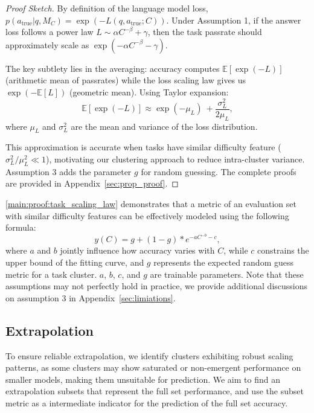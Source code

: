 \begin{proof}[Proof Sketch]
By definition of the language model loss, $p(a_{\text{true}}|q, M_C) = \exp(-L(q, a_{\text{true}}; C))$. Under Assumption 1, if the answer loss follows a power law $L \sim \alpha C^{-\beta} + \gamma$, then the task passrate should approximately scale as $\exp(-\alpha C^{-\beta} - \gamma)$.

The key subtlety lies in the averaging: accuracy computes $\mathbb{E}[\exp(-L)]$ (arithmetic mean of passrates) while the loss scaling law gives us $\exp(-\mathbb{E}[L])$ (geometric mean). Using Taylor expansion:
$$\mathbb{E}[\exp(-L)] \approx \exp(-\mu_L) \ + \frac{\sigma_L^2}{2\mu_L},$$
where $\mu_L$ and $\sigma_L^2$ are the mean and variance of the loss distribution.

This approximation is accurate when tasks have similar difficulty feature ($\sigma_L^2/\mu_L^2 \ll 1$), motivating our clustering approach to reduce intra-cluster variance. Assumption 3 adds the parameter $g$ for random guessing. The complete proofs are provided in Appendix~\ref{sec:prop_proof}.
\end{proof}
\cref{main:proof:task_scaling_law} demonstrates that a metric of an evaluation set with similar difficulty features can be effectively modeled using the following formula:
\begin{equation}
y(C)=g+(1-g)*e^{-aC^{-b}-c},
\label{eq:fitting}
\end{equation}
where $a$ and $b$ jointly influence how accuracy varies with $C$, while $c$ constrains the upper bound of the fitting curve, and $g$ represents the expected random guess metric for a task cluster. 
$a$, $b$, $c$, and $g$ are trainable parameters. 
Note that these assumptions may not perfectly hold in practice, we provide additional discussions on assumption 3 in Appendix~\ref{sec:limiations}.


\subsection{Extrapolation}
\label{sec:extrapolation}

To ensure reliable extrapolation, we identify clusters exhibiting robust scaling patterns, as some clusters may show saturated or non-emergent performance on smaller models, making them unsuitable for prediction. We aim to find an extrapolation subsets that represent the full set performance, and use the subset metric as a intermediate indicator for the prediction of the full set accuracy.

